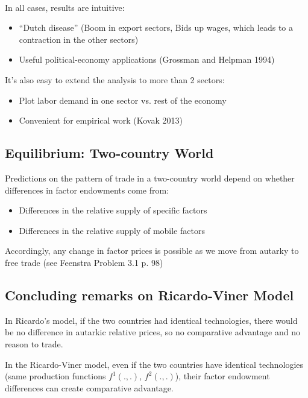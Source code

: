 \begin{note}
    \

    In all cases, results are intuitive:
    \begin{itemize}
        \item ``Dutch disease'' (Boom in export sectors, Bids up wages, which
        leads to a contraction in the other sectors)
        \item Useful political-economy applications (Grossman and Helpman
        1994)
    \end{itemize}

    It's also easy to extend the analysis to more than 2 sectors:
    \begin{itemize}
        \item Plot labor demand in one sector vs. rest of the economy
        \item Convenient for empirical work (Kovak 2013)
    \end{itemize}
\end{note}

\subsection{Equilibrium: Two-country World}

Predictions on the pattern of trade in a two-country world depend on
whether differences in factor endowments come from:
\begin{itemize}
    \item Differences in the relative supply of specific factors
    \item Differences in the relative supply of mobile factors
\end{itemize}
Accordingly, any change in factor prices is possible as we move from
autarky to free trade (see Feenstra Problem 3.1 p. 98)

\subsection{Concluding remarks on Ricardo-Viner Model}
In Ricardo's model, if the two countries had identical technologies,
there would be no difference in autarkic relative prices, so no
comparative advantage and no reason to trade.

In the Ricardo-Viner model, even if the two countries have identical
technologies (same production functions $f^1(., .)$, $f^2(., .)$),
their factor endowment differences can create comparative advantage.

